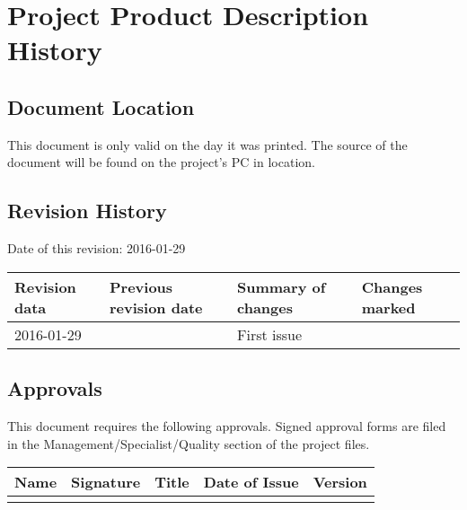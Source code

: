 \documentclass{report}
\begin{document}
\projectproduct
{}
\date{\today}
\author{P.Ryzhov}
\maketitle

\chapter{Project Product Description History}

\section{Document Location}
This document is only valid on the day it was printed.
The source of the document will be found on the project's PC in location.

\section{Revision History}

Date of this revision: 2016-01-29

\begin{center}
    \begin{tabular}{| p{2cm} | p{2cm} | l | p{2cm} |}
    \hline
    Revision data & Previous revision date & Summary of changes & Changes marked \\
    \hline
    2016-01-29 & & First issue & \\
    \hline
    \end{tabular}
\end{center}

\section{Approvals}
This document requires the following approvals.
Signed approval forms are filed in the Management/Specialist/Quality section of the project files.

\begin{center}
    \begin{tabular}{| p{2cm} | p{2cm} | l | p{2cm} | p{2cm} |}
    \hline
    Name & Signature & Title & Date of Issue & Version \\
    \hline
     & & & & \\
    \hline
    \end{tabular}
\end{center}
\end{document}
